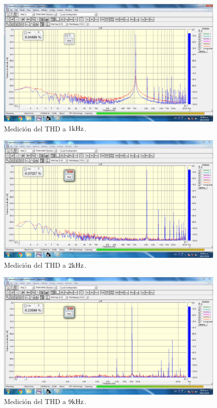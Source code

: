 \begin{figure}[H]
    \centering
    \includegraphics[width=0.95 \textwidth, angle=0]{img/mediciones/THD/1khz.png}
    \caption{Medición del THD a $1 \si[per-mode=symbol]{\kilo\hertz}$.}
    \label{fig:THD1kHz}
\end{figure}

\clearpage



\begin{figure}[H]
    \centering
    \includegraphics[width=0.95 \textwidth, angle=0]{img/mediciones/THD/2khz.png}
    \caption{Medición del THD a $2 \si[per-mode=symbol]{\kilo\hertz}$.}
    \label{fig:THD2khz}
\end{figure}



\begin{figure}[H]
    \centering
    \includegraphics[width=0.95 \textwidth, angle=0]{img/mediciones/THD/9khz.png}
    \caption{Medición del THD a $9 \si[per-mode=symbol]{\kilo\hertz}$.}
    \label{fig:THD9KHz}
\end{figure}


